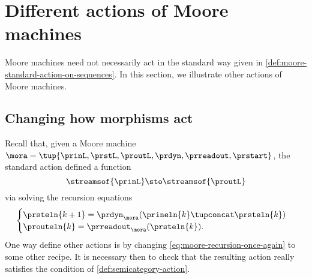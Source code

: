 
\section{Different actions of Moore machines}
\label{sec:different-actions-of-moore-machines}

Moore machines need not necessarily act in the standard way given in \cref{def:moore-standard-action-on-sequences}.
In this section, we illustrate other actions of Moore machines.

\subsection{Changing how morphisms act}

Recall that, given a Moore machine~$\mora = \tup{\prinL,\prstL,\proutL,\prdyn,\prreadout,\prstart}$, the standard action defined a function
\begin{equation}
    \streamsof{\prinL}  \sto \streamsof{\proutL}
\end{equation}
via solving the recursion equations
\begin{equation}
    \label{eq:moore-recursion-once-again}
    \begin{cases}
        \prsteln{k+1} = \prdyn_\mora(\prineln{k} \tupconcat \prsteln{k}) \\
        \prouteln{k}   = \prreadout_\mora(\prsteln{k}).
    \end{cases}
\end{equation}
%
One way define other actions is by changing \cref{eq:moore-recursion-once-again} to some other recipe.
It is necessary then to check that the resulting action really satisfies the condition of \cref{def:semicategory-action}.

